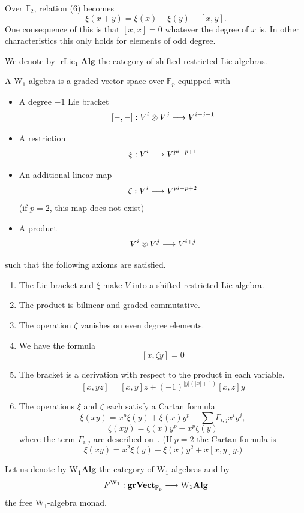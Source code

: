 \documentclass[AHL,Unicode,longabstracts,published]{cedram}
\DeclareMathOperator{\rlie}{rLie}
\newcommand{\alg}{\mathbf{Alg}}
\newcommand{\grVect}{\mathbf{grVect}}
\newcommand{\W}{\mathrm{W}}
\newcommand{\FF}{\mathbb{F}}
\renewcommand*{\to}{\mathchoice{\longrightarrow}{\rightarrow}{\rightarrow}{\rightarrow}}
\newcommand{\FF}{\mathbb{F}}
\begin{document}
\begin{rema}
Over $\FF_2$, relation (6) becomes
\[
\xi(x+y)=\xi(x)+\xi(y)+[x,y].
\]
One consequence of this is that $[x,x]=0$ whatever the degree of $x$ is. In other characteristics this only holds for elements of odd degree.
\end{rema}

We denote by $\rlie_1\alg$ the category of shifted restricted Lie algebras.

\begin{defi}\label{defi3.3}
A $\W_1$-algebra is a graded vector space over $\FF_p$ equipped with
\begin{itemize}
\item A degree $-1$ Lie bracket
\[
[-,-]: V^i\otimes V^j\to V^{i+j-1}
\]
\item A restriction
\[
\xi: V^i\to V^{pi-p+1}
\]
\item An additional linear map
\[
\zeta: V^i\to V^{pi-p+2}
\]
(if $p=2$, this map does not exist)
\item A product
\[
V^i\otimes V^j\to V^{i+j}
\]
\end{itemize}
such that the following axioms are satisfied.
\begin{enumerate}
\item\label{defi3.3.1} The Lie bracket and $\xi$ make $V$ into a shifted restricted Lie algebra.
\item\label{defi3.3.2} The product is bilinear and graded commutative.
\item\label{defi3.3.3} The operation $\zeta$ vanishes on even degree elements.
\item\label{defi3.3.4} We have the formula
\[
[x,\zeta y]=0
\]
\item\label{defi3.3.5} The bracket is a derivation with respect to the product in each variable.
\[
[x,yz]=[x,y]z+(-1)^{|y|(|x|+1)}[x,z]y
\]
\item\label{defi3.3.6} The operations $\xi$ and $\zeta$ each satisfy a Cartan formula
\[
\xi(xy)=x^p\xi(y)+\xi(x)y^p+\sum\Gamma_{i,j}x^iy^j,
\]
\[
\zeta(xy)=\zeta(x)y^p-x^p\zeta(y)
\]
where the term $\Gamma_{i,j}$ are described on~\cite[p.~335]{cohenladamay}. (If $p=2$ the Cartan formula is
\[
\xi(xy)=x^2\xi(y)+\xi(x)y^2+x[x,y]y.)
\]
\end{enumerate}
\end{defi}

Let us denote by $\W_1\alg$ the category of $\W_1$-algebras and by
\[
F^{\W_1}: \grVect_{\FF_p}\to \W_1\alg
\]
the free $\W_1$-algebra monad.
\end{document}
